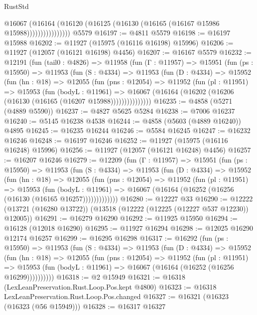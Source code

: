 \begin{lexlean}{RustStd}
\begin{coremodule}
                      @16067
                        (@16164
                          (@16120 (@16125 (@16130 (@16165 (@16167 @15986 @15988))))))))))))))))
    @5579
@16197 := @4811 @5579
@16198 := @16197 @15988
@16202 := @11927 (@15975 (@16116 @16198) @15996)
@16206 := @11927 (@12057 (@16121 @16198) @4456)
@16207 := @16167 @5579
@16232 := @12191
    (fun (tail0 : @4826) =>
    @11958
      (fun (Γ : @11957) =>
      @15951
        (fun (ps : @15950) =>
        @11953
          (fun (S : @4334) =>
          @11953
            (fun (D : @4334) =>
            @15952
              (fun (hn : @18) =>
              @12055
                (fun (pns : @12054) =>
                @11952
                  (fun (pl : @11951) =>
                  @15953
                    (fun (bodyL : @11961) =>
                    @16067 (@16164 (@16202 (@16206 (@16130 (@16165 (@16207 @15988)))))))))))))))
@16235 := @4858 (@5271 (@4889 @5590))
@16237 := @4827 @5625 @5284
@16238 := @7006 @16237
@16240 := @5145 @16238 @4538
@16244 := @4858 (@5603 (@4889 @16240)) @4895
@16245 := @16235 @16244
@16246 := @5584 @16245
@16247 := @16232 @16246
@16248 := @16197 @16246
@16252 := @11927 (@15975 (@16116 @16248) @15996)
@16256 := @11927 (@12057 (@16121 @16248) @4456)
@16257 := @16207 @16246
@16279 := @12209
    (fun (Γ : @11957) =>
    @15951
      (fun (ps : @15950) =>
      @11953
        (fun (S : @4334) =>
        @11953
          (fun (D : @4334) =>
          @15952
            (fun (hn : @18) =>
            @12055
              (fun (pns : @12054) =>
              @11952
                (fun (pl : @11951) =>
                @15953
                  (fun (bodyL : @11961) =>
                  @16067 (@16164 (@16252 (@16256 (@16130 (@16165 @16257)))))))))))))
@16280 := @12227 @33
@16290 := @12222 (@13721 (@16280 @13722)) (@13518 (@12222 (@12225 (@12227 @537 @12230)) @12005))
@16291 := @16279 @16290
@16292 := @11925 @15950
@16294 := @16128 (@12018 @16290)
@16295 := @11927 @16294
@16298 := @12025 @16290 @12174 @16257
@16299 := @16295 @16298
@16317 := @16292
    (fun (ps : @15950) =>
    @11953
      (fun (S : @4334) =>
      @11953
        (fun (D : @4334) =>
        @15952
          (fun (hn : @18) =>
          @12055
            (fun (pns : @12054) =>
            @11952
              (fun (pl : @11951) =>
              @15953 (fun (bodyL : @11961) => @16067 (@16164 (@16252 (@16256 @16299))))))))))
@16318 := @2 @15949
@16321 := @16318 (LexLeanPreservation.Rust.Loop.Pos.kept @4800)
@16323 := @16318 LexLeanPreservation.Rust.Loop.Pos.changed
@16327 := @16321 (@16323 (@16323 (@56 @15949)))
@16328 := @16317 @16327

\end{coremodule}
\end{lexlean}
